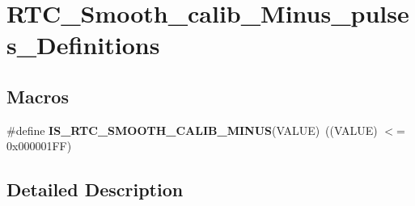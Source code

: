 \hypertarget{group___r_t_c___smooth__calib___minus__pulses___definitions}{}\section{R\+T\+C\+\_\+\+Smooth\+\_\+calib\+\_\+\+Minus\+\_\+pulses\+\_\+\+Definitions}
\label{group___r_t_c___smooth__calib___minus__pulses___definitions}
\subsection*{Macros}
\begin{DoxyCompactItemize}
\item 
\hypertarget{group___r_t_c___smooth__calib___minus__pulses___definitions_ga257f8bd6835bee480a80416bf086e200}{}\#define {\bfseries I\+S\+\_\+\+R\+T\+C\+\_\+\+S\+M\+O\+O\+T\+H\+\_\+\+C\+A\+L\+I\+B\+\_\+\+M\+I\+N\+U\+S}(V\+A\+L\+U\+E)~((V\+A\+L\+U\+E) $<$= 0x000001\+F\+F)\label{group___r_t_c___smooth__calib___minus__pulses___definitions_ga257f8bd6835bee480a80416bf086e200}

\end{DoxyCompactItemize}


\subsection{Detailed Description}
